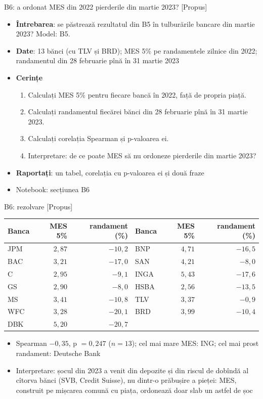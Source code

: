 \begin{frame}{B6: a ordonat MES din 2022 pierderile din martie 2023? [Propus]}
\itemsize{\footnotesize}
\begin{itemize}
\item \textbf{Întrebarea}: se păstrează rezultatul din B5 în tulburările bancare din martie 2023? Model: B5.
\item \textbf{Date}: 13 bănci (cu TLV și BRD); MES 5\% pe randamentele zilnice din 2022; randamentul din 28 februarie pînă în 31 martie 2023
\item \textbf{Cerințe}
\begin{enumerate}
    \item Calculați MES 5\% pentru fiecare bancă în 2022, față de propria piață.
    \item Calculați randamentul fiecărei bănci din 28 februarie pînă în 31 martie 2023.
    \item Calculați corelația Spearman și p-valoarea ei.
    \item Interpretare: de ce poate MES să nu ordoneze pierderile din martie 2023?
\end{enumerate}
\item \textbf{Raportați}: un tabel, corelația cu p-valoarea ei și două fraze
\item Notebook: secțiunea B6
\end{itemize}
\end{frame}

\ifsolutions
\begin{frame}{B6: rezolvare [Propus]}
\itemsize{\footnotesize}
\begin{center}
\scriptsize
\begin{tabular}{lrr|lrr}
\toprule
Banca & MES 5\% & randament (\%) & Banca & MES 5\% & randament (\%) \\
\midrule
JPM & $2{,}87$ & $-10{,}2$ & BNP & $4{,}71$ & $-16{,}5$ \\
BAC & $3{,}21$ & $-17{,}0$ & SAN & $4{,}21$ & $-8{,}0$ \\
C & $2{,}95$ & $-9{,}1$ & INGA & $5{,}43$ & $-17{,}6$ \\
GS & $2{,}90$ & $-8{,}0$ & HSBA & $2{,}56$ & $-13{,}5$ \\
MS & $3{,}41$ & $-10{,}8$ & TLV & $3{,}37$ & $-0{,}9$ \\
WFC & $3{,}28$ & $-20{,}1$ & BRD & $3{,}99$ & $-10{,}4$ \\
DBK & $5{,}20$ & $-20{,}7$ & & & \\
\bottomrule
\end{tabular}
\end{center}
\begin{itemize}
    \item Spearman $-0{,}35$, p $= 0{,}247$ ($n = 13$); cel mai mare MES: ING; cel mai prost randament: Deutsche Bank
    \item Interpretare: șocul din 2023 a venit din depozite și din riscul de dobîndă al cîtorva bănci (SVB, Credit Suisse), nu dintr-o prăbușire a pieței: MES, construit pe mișcarea comună cu piața, ordonează doar slab un astfel de șoc
\end{itemize}
\end{frame}
\fi


